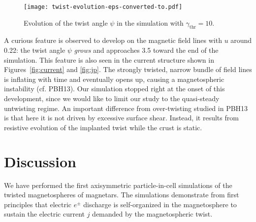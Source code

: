 \begin{figure}[t]
  \centering
  \texttt{[image: twist-evolution-eps-converted-to.pdf]}
  \caption{Evolution of the twist angle $\psi$
  in the simulation with $\gamma_\mathrm{thr} = 10$.
}
  \label{fig:twist}
\end{figure}

A curious feature is observed to develop on the magnetic field lines with $u$
around 0.22: the twist angle $\psi$ {\it grows} and approaches 3.5 toward the end
of the simulation. This feature is also seen in the current structure shown
in Figures~\ref{fig:current} and \ref{fig:jp}. The strongly twisted, narrow bundle
of field lines is inflating with time and eventually opens up, causing a
magnetospheric instability (cf. PBH13).
Our simulation stopped right
 at the onset of this development, since we would like to limit our study to the
 quasi-steady untwisting regime.
An important difference from over-twisting studied in PBH13
is that here it is not driven by excessive surface shear. Instead, it results from
resistive evolution of the implanted twist while the crust is static.



\section{Discussion}
\label{sec:discussion}


We have performed the first axisymmetric particle-in-cell simulations of the
twisted magnetospheres of magnetars. The simulations demonstrate from
first principles that electric $e^\pm$ discharge is self-organized in the magnetosphere
to sustain the electric current $j$ demanded by the magnetospheric twist.

